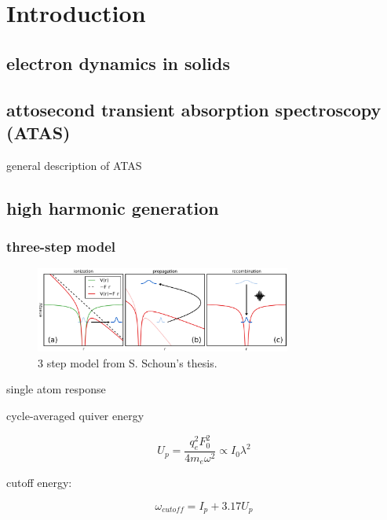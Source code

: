 \chapter{Introduction}

\section{electron dynamics in solids}

\section{attosecond transient absorption spectroscopy (ATAS)}



general description of ATAS

\section{high harmonic generation}

\subsection{three-step model}

\begin{figure}
	\centering
	\includegraphics[width=0.75\textwidth]{figures/chap1/ThreeStepModel.png}
	\caption{3 step model from S. Schoun's thesis\cite{schounAttosecondHighHarmonicSpectroscopy2015}.}
	\label{fig:ThreeStepModel}
\end{figure}

single atom response

cycle-averaged quiver energy

\begin{equation}
U_p = \frac{q_e^2 F_0^2}{4 m_e \omega^2} \propto I_0 \lambda^2
\label{eqn:Up}
\end{equation}

cutoff energy:

\begin{equation}
\omega_{cutoff} = I_p + 3.17 U_p
\label{eqn:cutoff}
\end{equation}

